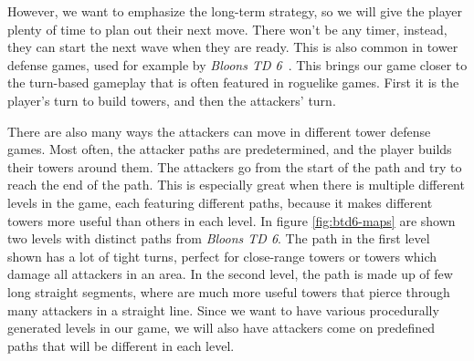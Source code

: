 However, we want to emphasize the long-term strategy, so we will give the player plenty of time to plan out their next move.
There won't be any timer, instead, they can start the next wave when they are ready.
This is also common in tower defense games, used for example by \emph{Bloons TD 6}~\cite{BTD6}.
This brings our game closer to the turn-based gameplay that is often featured in roguelike games.
First it is the player's turn to build towers, and then the attackers' turn.

There are also many ways the attackers can move in different tower defense games.
Most often, the attacker paths are predetermined, and the player builds their towers around them.
The attackers go from the start of the path and try to reach the end of the path.
This is especially great when there is multiple different levels in the game, each featuring different paths, because it makes different towers more useful than others in each level.
In figure \ref{fig:btd6-maps} are shown two levels with distinct paths from \emph{Bloons TD 6}.
The path in the first level shown has a lot of tight turns, perfect for close-range towers or towers which damage all attackers in an area.
In the second level, the path is made up of few long straight segments, where are much more useful towers that pierce through many attackers in a straight line.
Since we want to have various procedurally generated levels in our game, we will also have attackers come on predefined paths that will be different in each level.

